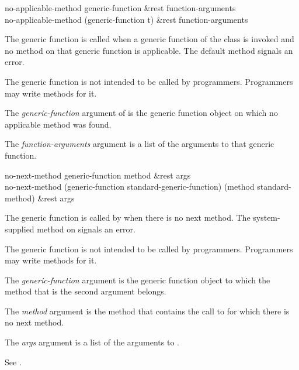 \begin{defun}
no-applicable-method generic-function &rest function-arguments \\
no-applicable-method (generic-function t) &rest function-arguments

The generic function  is called when a
generic function of the class  is invoked
and no method on that generic function is applicable.
The default method signals an error.

The generic function  is not intended to be called
by programmers.  Programmers may write methods for it.





The \emph{generic-function\/} argument of  is the
generic function object on which no applicable method was found.  

The \emph{function-arguments} argument is a list of the arguments to that
generic function.

\end{defun}

\begin{defun}
no-next-method generic-function method &rest args \\
no-next-method (generic-function standard-generic-function)
    (method standard-method) &rest args

The generic function  is called by 
 when there is no next method.  The system-supplied
method on  signals an error.

The generic function  is not intended to be called
by programmers.  Programmers may write methods for it.





The \emph{generic-function\/} argument is the generic function object
to which the method that is the second argument belongs.

The \emph{method\/} argument is the method that contains the call to
 for which there is no next method.

The \emph{args\/} argument is a list of the arguments to
.

See .

\end{defun}


